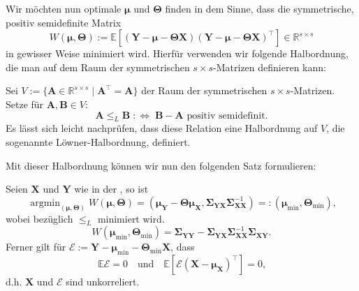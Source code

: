 \documentclass[]{article}
\newcommand{\E}{\mathbb{E}}
\newcommand{\R}{\mathbb{R}}
\newcommand{\X}{\mathbf{X}}
\newcommand{\Y}{\mathbf{Y}}
\newcommand{\T}{\mathbf{\Theta}}
\newcommand{\muu}{\bm{\mu}}
\newcommand{\Ssigma}{\mathbf{\Sigma}}
\newcommand{\A}{\mathbf{A}}
\newcommand{\B}{\mathbf{B}}
\DeclareMathOperator*{\argmin}{argmin}
\begin{document}
Wir möchten nun optimale $\muu$ und $\T$ finden in dem Sinne, dass die symmetrische, positiv semidefinite Matrix
$$W(\muu, \T) := \E[(\Y - \muu - \T \X)(\Y - \muu - \T \X)^\top] \in \R^{s \times s}$$ in gewisser Weise minimiert wird. Hierfür verwenden wir folgende Halbordnung, die man auf dem Raum der symmetrischen $s \times s$-Matrizen definieren kann:

\begin{definition}
	Sei $V:= \{\A \in \R^{s \times s} \;|\; \A^\top = \A \}$ der Raum der symmetrischen $s \times s$-Matrizen. Setze für $\A, \B \in V$:
	$$\A \leq_L \B \; :\Leftrightarrow \; \B - \A \text{ positiv semidefinit.}$$
	Es lässt sich leicht nachprüfen, dass diese Relation eine Halbordnung auf $V$, die sogenannte Löwner-Halbordnung, definiert.
\end{definition}
Mit dieser Halbordnung können wir nun den folgenden Satz formulieren:
\begin{theorem}
	\label{thm:mr}
	Seien $\X$ und $\Y$ wie in der , so ist
	$$ \argmin_{(\muu, \T)} W(\muu, \T) = (\muu_\Y - \T \muu_\X, \Ssigma_{\Y\X} \Ssigma_{\X\X}^{-1}) =: (\muu_{\min}, \T_{\min}) \text{,} $$
	wobei bezüglich $\leq_L$ minimiert wird. 
	$$W(\muu_{\min}, \T_{\min}) = \Ssigma_{\Y\Y} - \Ssigma_{\Y\X} \Ssigma_{\X\X}^{-1} \Ssigma_{\X\Y} \text{.}$$
	Ferner gilt für $\mathcal{E} := \Y - \muu_{\min} - \T_{\min} \X$, dass 
	$$\E \mathcal{E} = 0 \quad \text{und} \quad \E[\mathcal{E}(\X - \muu_\X)^\top] = 0 \text{,}$$
	d.h. $\X$ und $\mathcal{E}$ sind unkorreliert.
\end{theorem} 
\end{document}
